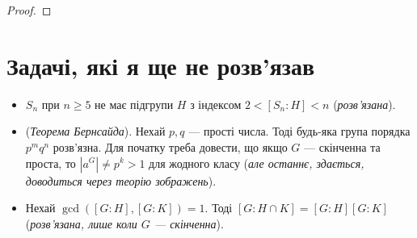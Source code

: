 \documentclass{math_library}
\begin{document}
\begin{proof}

\end{proof}

\newpage
\section*{Задачі, які я ще не розв'язав}
\begin{itemize}[wide=0pt]
\item $S_n$ при $n \geq 5$ не має підгрупи $H$ з індексом $2 < [S_n:H] < n$ (\textit{розв'язана}).

\item (\textit{Теорема Бернсайда}). Нехай $p,q$ --- прості числа. Тоді будь-яка група порядка $p^m q^n$ розв'язна. Для початку треба довести, що якщо $G$ --- скінченна та проста, то $|a^G| \neq p^k > 1$ для жодного класу (\textit{але останнє, здається, доводиться через теорію зображень}).

\item Нехай $\gcd([G:H],[G:K]) = 1$. Тоді $[G: H\cap K] = [G:H][G:K]$ (\textit{розв'язана, лише коли $G$ --- скінченна}).

\end{itemize}
\end{document}
